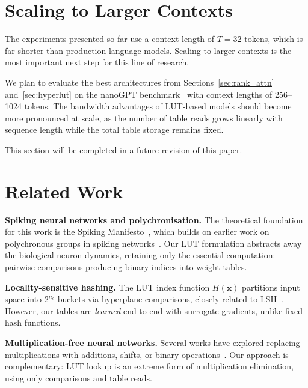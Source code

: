 \documentclass[11pt]{article}
\begin{document}
\section{Scaling to Larger Contexts}
\label{sec:scaling}

The experiments presented so far use a context length of $T = 32$ tokens, which is far shorter than production language models.
Scaling to larger contexts is the most important next step for this line of research.

We plan to evaluate the best architectures from Sections~\ref{sec:rank_attn} and~\ref{sec:hyperlut} on the nanoGPT benchmark~\cite{ref:nanogpt} with context lengths of 256--1024 tokens.
The bandwidth advantages of LUT-based models should become more pronounced at scale, as the number of table reads grows linearly with sequence length while the total table storage remains fixed.

This section will be completed in a future revision of this paper.


\section{Related Work}
\label{sec:related}

\textbf{Spiking neural networks and polychronisation.}
The theoretical foundation for this work is the Spiking Manifesto~\cite{ref:manifesto}, which builds on earlier work on polychronous groups in spiking networks~\cite{ref:polychrony}.
Our LUT formulation abstracts away the biological neuron dynamics, retaining only the essential computation: pairwise comparisons producing binary indices into weight tables.

\textbf{Locality-sensitive hashing.}
The LUT index function $H(\mathbf{x})$ partitions input space into $2^{n_c}$ buckets via hyperplane comparisons, closely related to LSH~\cite{ref:lsh}.
However, our tables are \emph{learned} end-to-end with surrogate gradients, unlike fixed hash functions.

\textbf{Multiplication-free neural networks.}
Several works have explored replacing multiplications with additions, shifts, or binary operations~\cite{ref:addernn}.
Our approach is complementary: LUT lookup is an extreme form of multiplication elimination, using only comparisons and table reads.


\end{document}
